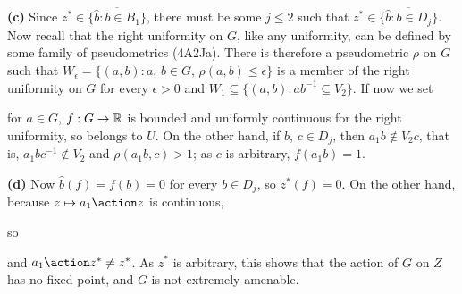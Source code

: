 {\medskip

{\bf (c)} Since $z^*\in\overline{\{\hat b:b\in B_1\}}$, there must be
some $j\le 2$ such that $z^*\in\overline{\{\hat b:b\in D_j\}}$.   Now
recall that the right uniformity on $G$, like any uniformity, can be
defined by some family of pseudometrics (4A2Ja).  There is therefore a
pseudometric $\rho$ on $G$ such that
$W_{\epsilon}=\{(a,b):a,\,b\in G,\,\rho(a,b)\le\epsilon\}$ is a member
of the right uniformity on $G$ for every $\epsilon>0$ and
$W_1\subseteq\{(a,b):ab^{-1}\subseteq V_2\}$.   If now we set


\noindent for $a\in G$, $f:G\to\Bbb R$ is bounded and uniformly
continuous for the right uniformity, so belongs to $U$.   On the other
hand, if $b$, $c\in D_j$, then $a_1b\notin V_2c$, that is,
$a_1bc^{-1}\notin V_2$ and $\rho(a_1b,c)>1$;  as $c$ is arbitrary,
$f(a_1b)=1$.

\medskip

{\bf (d)} Now $\hat b(f)=f(b)=0$ for every $b\in D_j$, so $z^*(f)=0$.
On the other hand, because $z\mapsto a_1\action z$ is continuous,


\noindent so


\noindent and $a_1\action z^*\ne z^*$.   As $z^*$ is arbitrary, this
shows that the action of $G$ on $Z$ has no fixed point, and $G$ is not
extremely amenable.
}%

